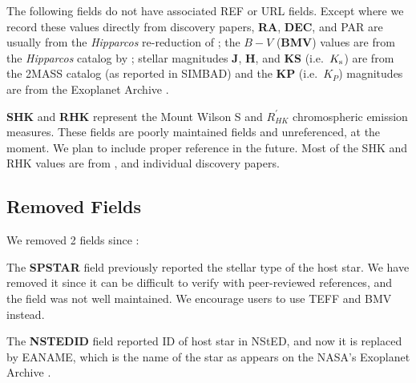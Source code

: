 \documentclass[11pt,preprint]{aastex}
\begin{document}
\begin{CJK*}{UTF8}{gbsn}
The following fields do not have associated REF or URL fields. Except
where we record these values directly from discovery papers, {\bf RA},
{\bf DEC}, and PAR are usually from the \textit{Hipparcos}
re-reduction of \cite{van Leeuwen2009}; the $B-V$ ({\bf BMV}) values
are from the \textit{Hipparcos} catalog by \cite{Perryman1997};
stellar magnitudes {\bf J}, {\bf H}, and {\bf KS} (i.e.\ $K_{\rm s}$)
are from the 2MASS catalog
\citep{Skrutskie2006} (as reported in SIMBAD) and the {\bf KP} (i.e.\ $K_P$) magnitudes are from the Exoplanet
Archive \citep{Akeson2013}.

{\bf SHK} and {\bf RHK} represent the Mount Wilson S and
$R^\prime_{HK}$ chromospheric
emission measures.  These fields are poorly maintained fields and
unreferenced, at the moment. We plan to include proper reference in
the future. Most of the SHK and RHK values are from \cite{Butler2006},
and individual discovery papers. 

\subsection{Removed Fields}\label{sec:removed}

We removed 2 fields since \cite{Wright2011}:

The {\bf SPSTAR} field previously reported the stellar type of the host
star.  We have removed it since it can be difficult to verify with
peer-reviewed references, and the field was not well maintained.  We encourage users
to use TEFF and BMV instead.

The {\bf NSTEDID} field reported ID of host star in NStED, and now it is
replaced by EANAME, which is the name of the star as appears on the
NASA's Exoplanet Archive \citep{Akeson2013}. 



\end{CJK*}
\end{document}
